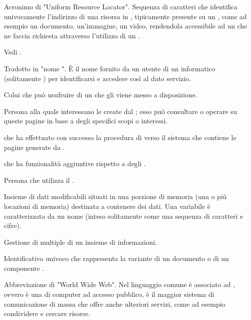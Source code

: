 {Acronimo di "Uniform Resource Locator". Sequenza di caratteri che identifica univocamente l'indirizzo di una risorsa in , tipicamente presente su un  , come ad esempio un documento, un'immagine, un video, rendendola accessibile ad un  che ne faccia richiesta attraverso l'utilizzo di un  .}

{Vedi .}

{Tradotto in "nome ". \`{E} il nome fornito da un utente di un  informatico (solitamente ) per identificarsi e accedere così al dato servizio.}

{Colui che può usufruire di un  che gli viene messo a disposizione.}

{Persona alla quale interessano le  create dal  ; esso può consultare o operare su queste pagine in base a degli specifici scopi o interessi.}

{ che ha effettuato con successo la procedura di  verso il sistema che contiene le pagine generate da .}

{ che ha funzionalità aggiuntive rispetto a degli .}

{Persona che utilizza il  .}


{Insieme di dati modificabili situati in una porzione di memoria (una o più locazioni di memoria) destinata a contenere dei dati. Una variabile è caratterizzata da un nome (inteso solitamente come una sequenza di caratteri e cifre).}

{Gestione di  multiple di un insieme di informazioni.}

{Identificativo univoco che rappresenta la variante di un documento o di un componente .}



{Abbreviazione di "World Wide Web". Nel linguaggio comune è associato ad , ovvero è una   di computer ad accesso pubblico, è il maggior sistema di comunicazione di massa che offre anche ulteriori servizi, come ad esempio condividere e cercare risorse.}
